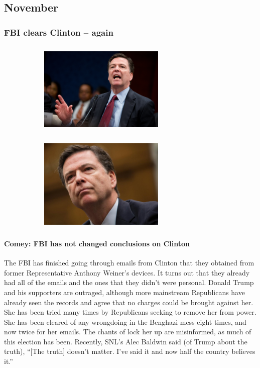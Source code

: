 \documentclass[twoside]{article}
\begin{document}
              \subsection{November}
              \subsubsection{FBI clears Clinton -- again}
              \vskip0.5cm
              \begin{figure}[H]
                \centering
                \begin{subfigure}{.4\textwidth}
                  \centering
                  \includegraphics[width=6cm,height=4.5cm,keepaspectratio]{images/articles/comey1.jpg}
                  \end{subfigure}%
                  \begin{subfigure}{.4\textwidth}
                    \centering
                    \includegraphics[width=6cm,height=4.5cm,keepaspectratio]{images/articles/comey2.jpg}
                    \end{subfigure}%
                  \end{figure}
              \paragraph{Comey: FBI has not changed conclusions on Clinton} The FBI has finished going through emails from Clinton that they obtained from former Representative Anthony Weiner’s devices. It turns out that they already had all of the emails and the ones that they didn’t were personal. Donald Trump and his supporters are outraged, although more mainstream Republicans have already seen the records and agree that no charges could be brought against her. She has been tried many times by Republicans seeking to remove her from power. She has been cleared of any wrongdoing in the Benghazi mess eight times, and now twice for her emails. The chants of lock her up are misinformed, as much of this election has been. Recently, SNL’s Alec Baldwin said (of Trump about the truth), “[The truth] doesn’t matter. I’ve said it and now half the country believes it.”
              \newpage
\end{document}
